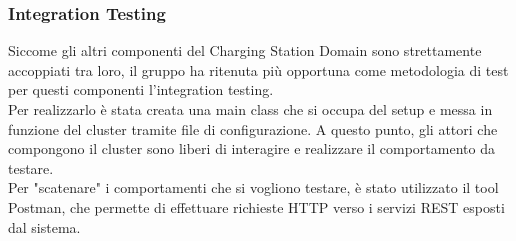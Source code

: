 \subsubsection{Integration Testing}
Siccome gli altri componenti del Charging Station Domain sono strettamente accoppiati tra loro,
il gruppo ha ritenuta più opportuna come metodologia di test per questi componenti l'integration testing.\\

Per realizzarlo è stata creata una main class che si occupa del setup e messa in funzione del cluster tramite
file di configurazione. A questo punto, gli attori che compongono il cluster sono liberi di interagire e
realizzare il comportamento da testare.\\

Per "scatenare" i comportamenti che si vogliono testare, è stato utilizzato il tool Postman, che
permette di effettuare richieste HTTP verso i servizi REST esposti dal sistema.\\







\newpage
